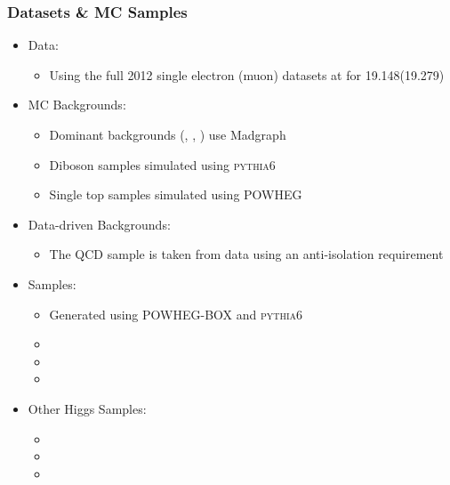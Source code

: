 \begin{frame}
	\frametitle{Datasets \& MC Samples}
	\label{frame:datasets_and_mc_samples}
	\vspace*{-0.24cm}
	\begin{block}{}
	\begin{itemize}
		\item Data:
		\begin{itemize}
			\item Using the full 2012 single electron (muon) datasets at \CM{8\tev} for 19.148\fbinv (19.279\fbinv)
		\end{itemize}
		\item MC Backgrounds:
		\begin{itemize}
			\item Dominant backgrounds (\Wjets, \ttbar, \Zjets) use Madgraph
			\item Diboson samples simulated using \textsc{pythia6}
			\item Single top samples simulated using \textsc{POWHEG}
		\end{itemize}
		\item Data-driven Backgrounds:
		\begin{itemize}
			\item The QCD sample is taken from data using an anti-isolation requirement
		\end{itemize}
		\item \HWW Samples:
		\begin{itemize}
			\item Generated using \textsc{POWHEG-BOX} and \textsc{pythia6}
			\item {}
			\item {}
			\item {}
		\end{itemize}
		\item Other Higgs Samples:
		\begin{itemize}
			\item {}
			\item {}
			\item {}
		\end{itemize}

\end{itemize}
\end{block}
\end{frame}
